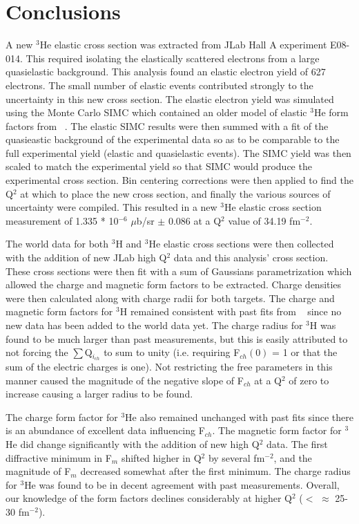 \chapter{Conclusions} %
\label{ch:conclusions} %

A new $^3$He elastic cross section was extracted from JLab Hall A experiment E08-014. This required isolating the elastically scattered electrons from a large quasielastic background. This analysis found an elastic electron yield of 627 electrons. The small number of elastic events contributed strongly to the uncertainty in this new cross section. The elastic electron yield was simulated using the Monte Carlo SIMC which contained an older model of elastic $^3$He form factors from ~\cite{Article:Amroun}. The elastic SIMC results were then summed with a fit of the quasieastic background of the experimental data so as to be comparable to the full experimental yield (elastic and quasielastic events). The SIMC yield was then scaled to match the experimental yield so that SIMC would produce the experimental cross section. Bin centering corrections were then applied to find the Q$^2$ at which to place the new cross section, and finally the various sources of uncertainty were compiled. This resulted in a new $^3$He elastic cross section measurement of 1.335 * 10$^{-6}$ $\mu$b/sr $\pm$ 0.086 at a Q$^2$ value of 34.19 fm$^{-2}$. 

The world data for both $^3$H and $^3$He elastic cross sections were then collected with the addition of new JLab high Q$^2$ data and this analysis' cross section. These cross sections were then fit with a sum of Gaussians parametrization which allowed the charge and magnetic form factors to be extracted. Charge densities were then calculated along with charge radii for both targets. The charge and magnetic form factors for $^3$H remained consistent with past fits from ~\cite{Article:Amroun} since no new data has been added to the world data yet. The charge radius for $^3$H was found to be much larger than past measurements, but this is easily attributed to not forcing the $\sum$Q$_{i_{ch}}$ to sum to unity (i.e. requiring F$_{ch}(0)$ = 1 or that the sum of the electric charges is one). Not restricting the free parameters in this manner caused the magnitude of the negative slope of F$_{ch}$ at a Q$^2$ of zero to increase causing a larger radius to be found.

The charge form factor for $^3$He also remained unchanged with past fits since there is an abundance of excellent data influencing F$_{ch}$. The magnetic form factor for $^3$He did change significantly with the addition of new high Q$^2$ data. The first diffractive minimum in F$_m$ shifted higher in Q$^2$ by several fm$^{-2}$, and the magnitude of F$_m$ decreased somewhat after the first minimum. The charge radius for $^3$He was found to be in decent agreement with past measurements. Overall, our knowledge of the form factors declines considerably at higher Q$^2$ ($<$ $\approx$ 25-30 fm$^{-2}$). 

